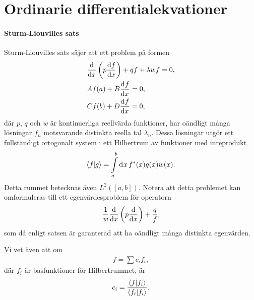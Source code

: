 \section{Ordinarie differentialekvationer}

\paragraph{Sturm-Liouvilles sats}
Sturm-Liouvilles sats säjer att ett problem på formen
\begin{align*}
	&\dv{x}\left(p\dv{f}{x}\right) + qf + \lambda wf = 0, \\
	&Af(a) + B\dv[]{f}{x} (a) = 0, \\
	&Cf(b) + D\dv[]{f}{x} (b) = 0,
\end{align*}
där $p$, $q$ och $w$ är kontinuerliga reellvärda funktioner, har oändligt många lösningar $f_{n}$ motsvarande distinkta reella tal $\lambda_{n}$. Dessa lösningar utgör ett fullständigt ortogonalt system i ett Hilbertrum av funktioner med inreprodukt
\begin{align*}
	\bra{f}\ket{g} = \int\limits_{a}^{b}\dd[]{x}f^{*}(x)g(x)w(x).
\end{align*}
Detta rummet betecknas även $L^{2}([a, b])$. Notera att detta problemet kan omformuleras till ett egenvärdesproblem för operatorn
\begin{align*}
	\frac{1}{w}\dv{x}\left(p\dv{x}\right) + \frac{q}{f},
\end{align*}
som då enligt satsen är garanterad att ha oändligt många distinkta egenvärden.

Vi vet även att om
\begin{align*}
	f = \sum c_{i}f_{i},
\end{align*}
där $f_{i}$ är basfunktioner för Hilbertrummet, är
\begin{align*}
	c_{i} = \frac{\bra{f}\ket{f_{i}}}{\bra{f_{i}}\ket{f_{i}}}.
\end{align*}